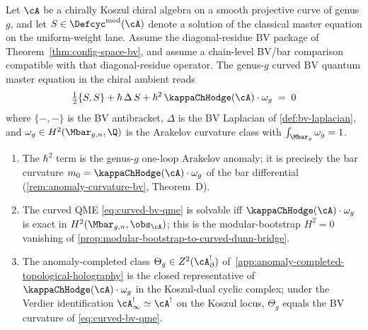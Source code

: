 \begin{theorem}
\label{thm:curved-bv-qme-genus-g}
Let $\cA$ be a chirally Koszul chiral algebra on a smooth projective
curve of genus $g$, and let $S \in \Defcyc^{\mathrm{mod}}(\cA)$ denote
a solution of the classical master equation on the uniform-weight lane.
Assume the diagonal-residue BV package of
Theorem~\ref{thm:config-space-bv}, and assume a chain-level BV/bar
comparison compatible with that diagonal-residue operator.
The genus-$g$ curved BV quantum master equation in the chiral ambient
reads
\begin{equation}\label{eq:curved-bv-qme}
\tfrac{1}{2}\{S,S\} + \hbar\,\Delta\,S + \hbar^{2}\,\kappaChHodge(\cA)\cdot
\omega_g \;=\; 0
\end{equation}
where $\{{-},{-}\}$ is the BV antibracket, $\Delta$ is the BV Laplacian
of \autoref{def:bv-laplacian}, and $\omega_g \in H^{2}(\Mbar_{g,n},\Q)$
is the Arakelov curvature class with $\int_{\Mbar_g}\omega_g = 1$.
\begin{enumerate}[label=\textup{(\roman*)}]
\item The $\hbar^{2}$ term is the genus-$g$ one-loop Arakelov anomaly;
 it is precisely the bar curvature $m_0 = \kappaChHodge(\cA)\cdot\omega_g$
 of the bar differential (\autoref{rem:anomaly-curvature-bv},
 Theorem~D).
\item The curved QME \eqref{eq:curved-bv-qme} is solvable iff
 $\kappaChHodge(\cA)\cdot\omega_g$ is exact in
 $H^{2}(\Mbar_{g,n},\obs_{\cA})$; this is the modular-bootstrap
 $H^{2}=0$ vanishing of
 \autoref{prop:modular-bootstrap-to-curved-dunn-bridge}.
\item The anomaly-completed class $\Theta_g \in Z^{2}(\cA^{!}_{\partial})$
 of~\autoref{app:anomaly-completed-topological-holography}
 is the closed representative of $\kappaChHodge(\cA)\cdot\omega_g$ in the
 Koszul-dual cyclic complex; under the Verdier identification
 $\cA^{!}_{\infty} \simeq \cA^{!}$ on the Koszul locus,
 $\Theta_g$ equals the BV curvature of
 \eqref{eq:curved-bv-qme}.
\end{enumerate}
\end{theorem}

